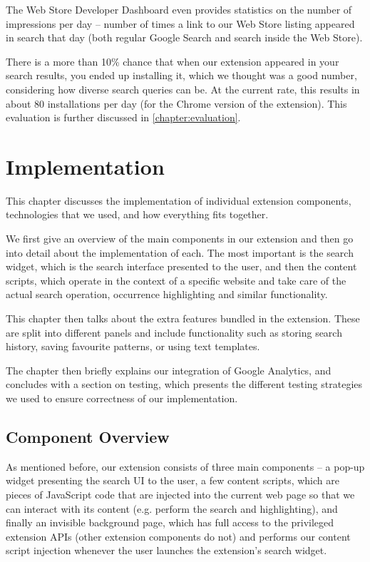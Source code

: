 \documentclass[bsc,frontabs,twoside,singlespacing,parskip,deptreport]{infthesis}
\begin{document}
The Web Store Developer Dashboard even provides statistics on the number of impressions per day -- number of times a link to our Web Store listing appeared in search that day (both regular Google Search and search inside the Web Store).

There is a more than 10\% chance that when our extension appeared in your search results, you ended up installing it, which we thought was a good number, considering how diverse search queries can be. At the current rate, this results in about 80 installations per day (for the Chrome version of the extension). This evaluation is further discussed in \autoref{chapter:evaluation}.


\chapter{Implementation}
\label{chapter:implementation}

This chapter discusses the implementation of individual extension components, technologies that we used, and how everything fits together.

We first give an overview of the main components in our extension and then go into detail about the implementation of each. The most important is the search widget, which is the search interface presented to the user, and then the content scripts, which operate in the context of a specific website and take care of the actual search operation, occurrence highlighting and similar functionality.

This chapter then talks about the extra features bundled in the extension. These are split into different panels and include functionality such as storing search history, saving favourite patterns, or using text templates.

The chapter then briefly explains our integration of Google Analytics, and concludes with a section on testing, which presents the different testing strategies we used to ensure correctness of our implementation.

\section{Component Overview}
As mentioned before, our extension consists of three main components -- a pop-up widget presenting the search UI to the user, a few content scripts, which are pieces of JavaScript code that are injected into the current web page so that we can interact with its content (e.g. perform the search and highlighting), and finally an invisible background page, which has full access to the privileged extension APIs (other extension components do not) and performs our content script injection whenever the user launches the extension's search widget.
\end{document}
